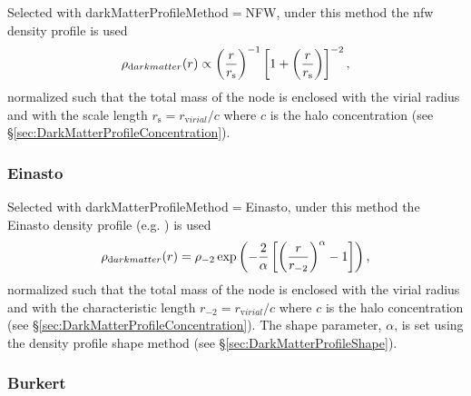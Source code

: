 Selected with {\normalfont \ttfamily darkMatterProfileMethod}$=${\normalfont \ttfamily NFW}, under this method the \gls{nfw} density profile \citep{navarro_universal_1997} is used
\begin{equation}
  \rho_{\mathrm dark matter}(r) \propto \left({r\over r_{\mathrm s}}\right)^{-1} \left[1 + \left({r\over r_{\mathrm s}}\right) \right]^{-2},
\end{equation}
normalized such that the total mass of the \gls{node} is enclosed with the virial radius and with the scale length $r_{\mathrm s} = r_{\mathrm virial}/c$ where $c$ is the halo concentration (see \S\ref{sec:DarkMatterProfileConcentration}).

\subsubsection{Einasto}\label{phys:darkMatterProfile:darkMatterProfileEinasto}

Selected with {\normalfont \ttfamily darkMatterProfileMethod}$=${\normalfont \ttfamily Einasto}, under this method the Einasto density profile (e.g. \citealt{cardone_spherical_2005}) is used
\begin{equation}
  \rho_{\mathrm dark matter}(r) = \rho_{-2} \exp \left( - {2 \over \alpha} \left[ \left( {r \over r_{-2}} \right)^\alpha - 1 \right] \right),
\end{equation}
normalized such that the total mass of the \gls{node} is enclosed with the virial radius and with the characteristic length $r_{-2} = r_{\mathrm virial}/c$ where $c$ is the halo concentration (see \S\ref{sec:DarkMatterProfileConcentration}). The shape parameter, $\alpha$, is set using the density profile shape method (see \S\ref{sec:DarkMatterProfileShape}).

\subsubsection{Burkert}\label{phys:darkMatterProfile:darkMatterProfileBurkert}

